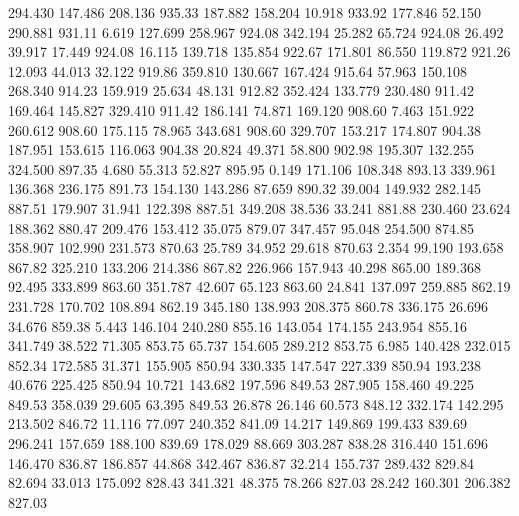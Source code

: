  294.430  147.486  208.136       935.33
 187.882  158.204   10.918       933.92
 177.846   52.150  290.881       931.11
   6.619  127.699  258.967       924.08
 342.194   25.282   65.724       924.08
  26.492   39.917   17.449       924.08
  16.115  139.718  135.854       922.67
 171.801   86.550  119.872       921.26
  12.093   44.013   32.122       919.86
 359.810  130.667  167.424       915.64
  57.963  150.108  268.340       914.23
 159.919   25.634   48.131       912.82
 352.424  133.779  230.480       911.42
 169.464  145.827  329.410       911.42
 186.141   74.871  169.120       908.60
   7.463  151.922  260.612       908.60
 175.115   78.965  343.681       908.60
 329.707  153.217  174.807       904.38
 187.951  153.615  116.063       904.38
  20.824   49.371   58.800       902.98
 195.307  132.255  324.500       897.35
   4.680   55.313   52.827       895.95
   0.149  171.106  108.348       893.13
 339.961  136.368  236.175       891.73
 154.130  143.286   87.659       890.32
  39.004  149.932  282.145       887.51
 179.907   31.941  122.398       887.51
 349.208   38.536   33.241       881.88
 230.460   23.624  188.362       880.47
 209.476  153.412   35.075       879.07
 347.457   95.048  254.500       874.85
 358.907  102.990  231.573       870.63
  25.789   34.952   29.618       870.63
   2.354   99.190  193.658       867.82
 325.210  133.206  214.386       867.82
 226.966  157.943   40.298       865.00
 189.368   92.495  333.899       863.60
 351.787   42.607   65.123       863.60
  24.841  137.097  259.885       862.19
 231.728  170.702  108.894       862.19
 345.180  138.993  208.375       860.78
 336.175   26.696   34.676       859.38
   5.443  146.104  240.280       855.16
 143.054  174.155  243.954       855.16
 341.749   38.522   71.305       853.75
  65.737  154.605  289.212       853.75
   6.985  140.428  232.015       852.34
 172.585   31.371  155.905       850.94
 330.335  147.547  227.339       850.94
 193.238   40.676  225.425       850.94
  10.721  143.682  197.596       849.53
 287.905  158.460   49.225       849.53
 358.039   29.605   63.395       849.53
  26.878   26.146   60.573       848.12
 332.174  142.295  213.502       846.72
  11.116   77.097  240.352       841.09
  14.217  149.869  199.433       839.69
 296.241  157.659  188.100       839.69
 178.029   88.669  303.287       838.28
 316.440  151.696  146.470       836.87
 186.857   44.868  342.467       836.87
  32.214  155.737  289.432       829.84
  82.694   33.013  175.092       828.43
 341.321   48.375   78.266       827.03
  28.242  160.301  206.382       827.03

